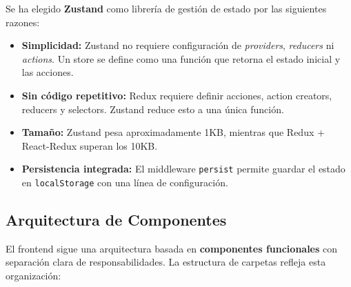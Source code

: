 Se ha elegido \textbf{Zustand} como librería de gestión de estado por las siguientes razones:

\begin{itemize}
    \item \textbf{Simplicidad:} Zustand no requiere configuración de \textit{providers}, \textit{reducers} ni \textit{actions}. Un store se define como una función que retorna el estado inicial y las acciones.
    \item \textbf{Sin código repetitivo:} Redux requiere definir acciones, action creators, reducers y selectors. Zustand reduce esto a una única función.
    \item \textbf{Tamaño:} Zustand pesa aproximadamente 1KB, mientras que Redux + React-Redux superan los 10KB.
    \item \textbf{Persistencia integrada:} El middleware \texttt{persist} permite guardar el estado en \texttt{localStorage} con una línea de configuración.
\end{itemize}

\subsection{Arquitectura de Componentes}

El frontend sigue una arquitectura basada en \textbf{componentes funcionales} con separación clara de responsabilidades. La estructura de carpetas refleja esta organización:

